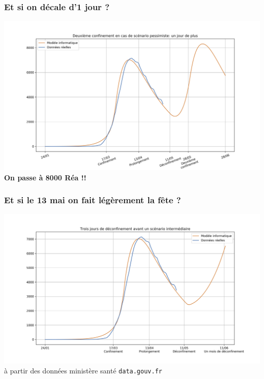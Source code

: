 \documentclass[a4paper]{cours-bdd}
\begin{document}

\begin{frame}[fragile]
\frametitle{Et si on décale d'1 jour ?}

\begin{center}
    \includegraphics[width=1.0\linewidth]{figure7.jpg} \\

      \textbf{On passe à 8000 Réa !!}
  \end{center}
  
\end{frame}


\begin{frame}[fragile]
\frametitle{Et si le 13 mai on fait légèrement la fête ?}

  \begin{center}
    \includegraphics[width=1.0\linewidth]{figure8.jpg} \\
    {\tiny à partir des données ministère santé \texttt{data.gouv.fr}}
  \end{center}
  
\end{frame}
\end{document}
